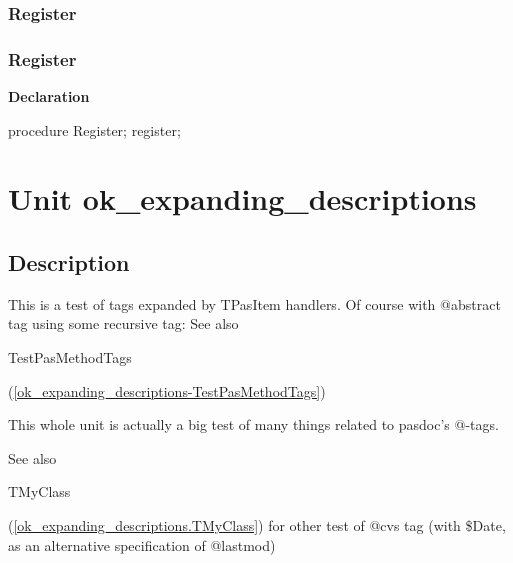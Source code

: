 \documentclass{report}
\newif\ifpdf
\begin{document}
\subsection*{\large{\textbf{Register}}\normalsize\hspace{1ex}\hrulefill}
\else
\subsection*{Register}
\fi
\label{ok_directive_as_identifier-Register}
\begin{list}{}{
\setlength{\itemindent}{0cm}
\setlength{\listparindent}{0cm}
\setlength{\leftmargin}{\evensidemargin}
\addtolength{\leftmargin}{\tmplength}
\settowidth{\labelsep}{X}
\addtolength{\leftmargin}{\labelsep}
\setlength{\labelwidth}{\tmplength}
}
\item[\textbf{Declaration}\hfill]
\ifpdf
\begin{flushleft}
\fi
\begin{ttfamily}
procedure Register; register;\end{ttfamily}

\ifpdf
\end{flushleft}
\fi

\end{list}
\chapter{Unit ok{\_}expanding{\_}descriptions}
\label{ok_expanding_descriptions}
\section{Description}
This is a test of tags expanded by TPasItem handlers. Of course with @abstract tag using some recursive tag: See also \begin{ttfamily}TestPasMethodTags\end{ttfamily}(\ref{ok_expanding_descriptions-TestPasMethodTags})\hfill\vspace*{1ex}



This whole unit is actually a big test of many things related to pasdoc's @{-}tags.

   

See also \begin{ttfamily}TMyClass\end{ttfamily}(\ref{ok_expanding_descriptions.TMyClass}) for other test of @cvs tag (with {\$}Date, as an alternative specification of @lastmod)
\end{document}
